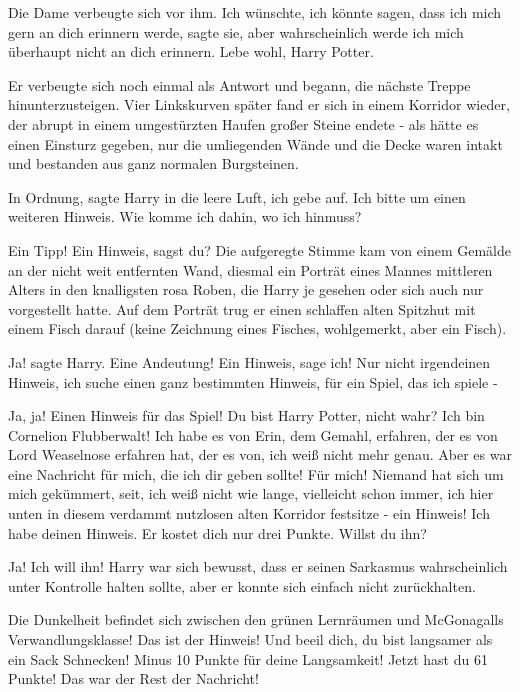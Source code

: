 Die Dame verbeugte sich vor ihm. \glqq{}Ich wünschte, ich könnte sagen, dass ich
mich gern an dich erinnern werde\grqq{}, sagte sie, \glqq{}aber wahrscheinlich
werde ich mich überhaupt nicht an dich erinnern. Lebe wohl, Harry Potter.\grqq{}

Er verbeugte sich noch einmal als Antwort und begann, die nächste Treppe
hinunterzusteigen. Vier Linkskurven später fand er sich in einem Korridor
wieder, der abrupt in einem umgestürzten Haufen großer Steine endete - als hätte
es einen Einsturz gegeben, nur die umliegenden Wände und die Decke waren intakt
und bestanden aus ganz normalen Burgsteinen.

\glqq{}In Ordnung\grqq{}, sagte Harry in die leere Luft, \glqq{}ich gebe auf. Ich
bitte um einen weiteren Hinweis. Wie komme ich dahin, wo ich hinmuss?\grqq{}

\glqq{}Ein Tipp! Ein Hinweis, sagst du?\grqq{} Die aufgeregte Stimme kam von
einem Gemälde an der nicht weit entfernten Wand, diesmal ein Porträt eines
Mannes mittleren Alters in den knalligsten rosa Roben, die Harry je gesehen oder
sich auch nur vorgestellt hatte. Auf dem Porträt trug er einen schlaffen alten
Spitzhut mit einem Fisch darauf (keine Zeichnung eines Fisches, wohlgemerkt,
aber ein Fisch).

\glqq{}Ja!\grqq{} sagte Harry. \glqq{}Eine Andeutung! Ein Hinweis, sage ich! Nur
nicht irgendeinen Hinweis, ich suche einen ganz bestimmten Hinweis, für ein
Spiel, das ich spiele -\grqq{}

\glqq{}Ja, ja! Einen Hinweis für das Spiel! Du bist Harry Potter, nicht wahr? Ich
bin Cornelion Flubberwalt! Ich habe es von Erin, dem Gemahl, erfahren, der es
von Lord Weaselnose erfahren hat, der es von, ich weiß nicht mehr genau. Aber es
war eine Nachricht für mich, die ich dir geben sollte! Für mich! Niemand hat
sich um mich gekümmert, seit, ich weiß nicht wie lange, vielleicht schon immer,
ich hier unten in diesem verdammt nutzlosen alten Korridor festsitze - ein
Hinweis! Ich habe deinen Hinweis. Er kostet dich nur drei Punkte. Willst du
ihn?\grqq{}

\glqq{}Ja! Ich will ihn!\grqq{} Harry war sich bewusst, dass er seinen Sarkasmus
wahrscheinlich unter Kontrolle halten sollte, aber er konnte sich einfach nicht
zurückhalten.

\glqq{}Die Dunkelheit befindet sich zwischen den grünen Lernräumen und
McGonagalls Verwandlungsklasse! Das ist der Hinweis! Und beeil dich, du bist
langsamer als ein Sack Schnecken! Minus 10 Punkte für deine Langsamkeit! Jetzt
hast du 61 Punkte! Das war der Rest der Nachricht!\grqq{}

